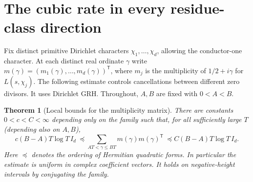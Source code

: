 \documentclass[11pt]{article}
\newtheorem{theorem}{Theorem}[section]
\begin{document}
\section{The cubic rate in every residue-class direction}\label{sec:familyrate}

Fix distinct primitive Dirichlet characters $\chi_1,\ldots,\chi_d$,
allowing the conductor-one character. At each distinct real ordinate
$\gamma$ write $m(\gamma)=(m_1(\gamma),\ldots,m_d(\gamma))^{\mathsf T}$,
where $m_j$ is the multiplicity of $1/2+i\gamma$ for $L(s,\chi_j)$.
The following estimate controls cancellations between different zero divisors.
It uses Dirichlet GRH. Throughout, $A,B$ are fixed with $0<A<B$.

\begin{theorem}[Local bounds for the multiplicity matrix]\label{thm:familyrate}
There are constants $0<c<C<\infty$ depending only on the family such that,
for all sufficiently large $T$ (depending also on $A,B$),
\[
 c(B-A)T\log T\, I_d \ \preceq\!
 \sum_{AT<\gamma\le BT}m(\gamma)m(\gamma)^{\mathsf T}
 \ \preceq C(B-A)T\log T\, I_d .
\]
Here $\preceq$ denotes the ordering of Hermitian quadratic forms. In particular the
estimate is uniform in complex coefficient vectors. It holds on negative-height
intervals by conjugating the family.
\end{theorem}
\end{document}
